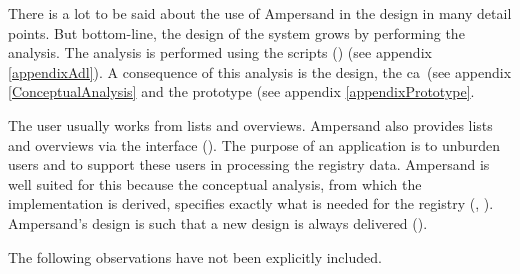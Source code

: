 There is a lot to be said about the use of Ampersand in the design in many detail points.
But bottom-line, the design of the system grows by performing the analysis.
The analysis is performed using the scripts () (see appendix \ref{appendixAdl}).
A consequence of this analysis is the design, the \acrshort{ca}~(see appendix \ref{ConceptualAnalysis} and the prototype (see appendix \ref{appendixPrototype}.

The user usually works from lists and overviews.
Ampersand also provides lists and overviews via the interface ().
The purpose of an application is to unburden users and to support these users in processing the registry data.
Ampersand is well suited for this because the conceptual analysis, from which the implementation is derived, specifies exactly what is needed for the registry (, ).
Ampersand's design is such that a new design is always delivered ().

The following observations have not been explicitly included.
